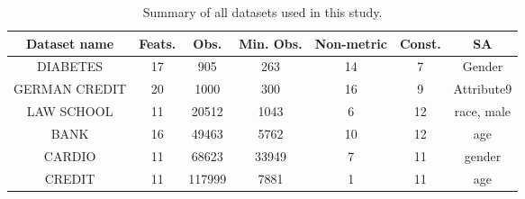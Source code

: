 \begin{table}
\caption{Summary of all datasets used in this study.}
\label{tab:datasets-summary}
\begin{tabular}{ccccccc}
\toprule
Dataset name & Feats. & Obs. & Min. Obs. & Non-metric & Const. & SA \\
\midrule
DIABETES & 17 & 905 & 263 & 14 & 7 & Gender \\
GERMAN CREDIT & 20 & 1000 & 300 & 16 & 9 & Attribute9 \\
LAW SCHOOL & 11 & 20512 & 1043 & 6 & 12 & race, male \\
BANK & 16 & 49463 & 5762 & 10 & 12 & age \\
CARDIO & 11 & 68623 & 33949 & 7 & 11 & gender \\
CREDIT & 11 & 117999 & 7881 & 1 & 11 & age \\
\bottomrule
\end{tabular}
\end{table}
